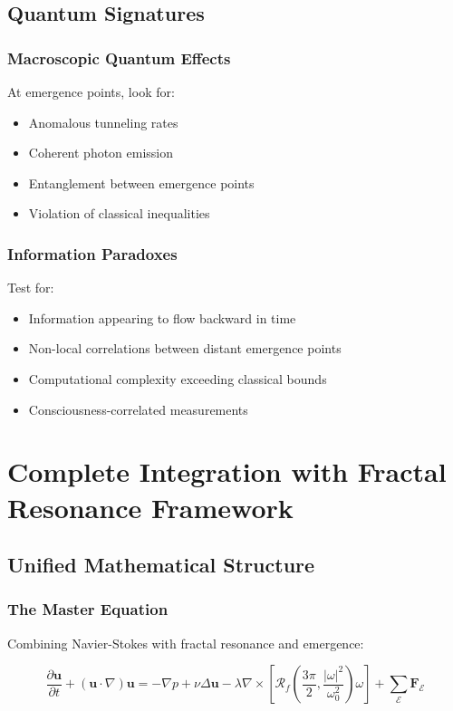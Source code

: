 \documentclass[12pt]{article}
\newcommand{\fractalres}{\mathcal{R}_f}
\newcommand{\emergencept}{\mathcal{E}}
\begin{document}
\subsection{Quantum Signatures}

\subsubsection{Macroscopic Quantum Effects}

At emergence points, look for:
\begin{itemize}
\item Anomalous tunneling rates
\item Coherent photon emission
\item Entanglement between emergence points
\item Violation of classical inequalities
\end{itemize}

\subsubsection{Information Paradoxes}

Test for:
\begin{itemize}
\item Information appearing to flow backward in time
\item Non-local correlations between distant emergence points
\item Computational complexity exceeding classical bounds
\item Consciousness-correlated measurements
\end{itemize}

\section{Complete Integration with Fractal Resonance Framework}

\subsection{Unified Mathematical Structure}

\subsubsection{The Master Equation}

Combining Navier-Stokes with fractal resonance and emergence:

\begin{equation}
\frac{\partial \mathbf{u}}{\partial t} + (\mathbf{u} \cdot \nabla)\mathbf{u} = -\nabla p + \nu \Delta \mathbf{u} - \lambda \nabla \times \left[\fractalres\left(\frac{3\pi}{2}, \frac{|\omega|^2}{\omega_0^2}\right) \omega\right] + \sum_{\emergencept} \mathbf{F}_{\emergencept}
\end{equation}
\end{document}
